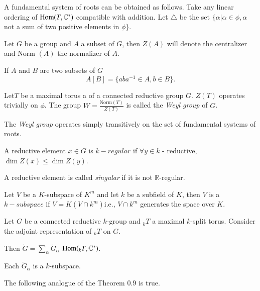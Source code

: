 \begin{remark*}
  A fundamental system of roots can be obtained as follows. Take any
  linear ordering of $\operatorname{Hom} (T, \mathbb{C}^*)$ compatible with
  addition. Let $\triangle$ be the set $\{ \alpha \big| \alpha
  \in \phi, \alpha$ not a sum of two positive elements in
  $\phi \}$.
\end{remark*}

\begin{notns}
        Let $G$ be a group and $A$ a subset of
        $G$, then $Z(A)$ will denote the centralizer and Norm $(A)$ the
        normalizer of $A$.
\end{notns}

If $A$ and $B$ are two subsets of $G$
$$
A[B] = \{ a b a^{-1} \in A, b \in B\}.
$$

\begin{defi*}
  Let\pageoriginale $T$ be a maximal torus a of a connected reductive group
  $G$. $Z(T)$ operates trivially on $\phi$. The group $W=
  \frac{\text{Norm} (T)}{Z(T)}$ is called the \textit{Weyl group} of $G$.
\end{defi*}

\begin{thm}\label{chap0:thm0.10} %
  The \textit{Weyl group} operates simply transitively on the set of
  fundamental systems of roots.
\end{thm}

\begin{defis*}
  A reductive element $x \in G$ is $k-regular$ if $\forall y
  \in k$ - reductive, $\dim Z(x) \leq \dim Z(y)$.  
\end{defis*}

A reductive element is called \textit{singular} if it is not
$\mathbb{R}$-regular. 

Let $V$ be a $K$-subspace of $K^m$ and let $k$ be a subfield of $K$,
then $V$ is a $k-subspace$ if $V=K(V \cap k^m)$i.e., $V \cap k^m$
generates the space over $K$.

Let $G$ be a connected reductive $k$-group and ${}_kT$ a maximal
$k$-split torus. Consider the adjoint representation of ${}_k T$ on $G$.

Then $\ring{G}= \displaystyle{\sum_\alpha} \ring{G}_\alpha$ \quad
$\operatorname{Hom} ({}_k T, \mathbb{C}^*)$.

Each $\ring{G}_\alpha$ is a $k$-subspace.

The following analogue of the Theorem 0.9 is true.

